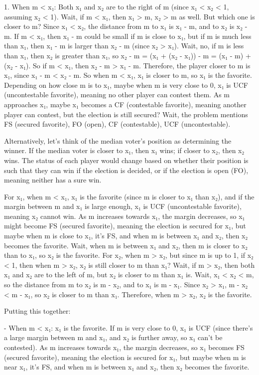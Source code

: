1. When m < x₁: Both x₁ and x₂ are to the right of m (since x₁ < x₂ < 1, assuming x₂ < 1). Wait, if m < x₁, then x₁ > m, x₂ > m as well. But which one is closer to m? Since x₁ < x₂, the distance from m to x₁ is x₁ - m, and to x₂ is x₂ - m. If m < x₁, then x₁ - m could be small if m is close to x₁, but if m is much less than x₁, then x₁ - m is larger than x₂ - m (since x₂ > x₁). Wait, no, if m is less than x₁, then x₂ is greater than x₁, so x₂ - m = (x₁ + (x₂ - x₁)) - m = (x₁ - m) + (x₂ - x₁). So if m < x₁, then x₂ - m > x₁ - m. Therefore, the player closer to m is x₁, since x₁ - m < x₂ - m. So when m < x₁, x₁ is closer to m, so x₁ is the favorite. Depending on how close m is to x₁, maybe when m is very close to 0, x₁ is UCF (uncontestable favorite), meaning no other player can contest them. As m approaches x₁, maybe x₁ becomes a CF (contestable favorite), meaning another player can contest, but the election is still secured? Wait, the problem mentions FS (secured favorite), FO (open), CF (contestable), UCF (uncontestable). 

Alternatively, let's think of the median voter's position as determining the winner. If the median voter is closer to x₁, then x₁ wins; if closer to x₂, then x₂ wins. The status of each player would change based on whether their position is such that they can win if the election is decided, or if the election is open (FO), meaning neither has a sure win. 

For x₁, when m < x₁, x₁ is the favorite (since m is closer to x₁ than x₂), and if the margin between m and x₁ is large enough, x₁ is UCF (uncontestable favorite), meaning x₂ cannot win. As m increases towards x₁, the margin decreases, so x₁ might become FS (secured favorite), meaning the election is secured for x₁, but maybe when m is close to x₁, it's FS, and when m is between x₁ and x₂, then x₂ becomes the favorite. Wait, when m is between x₁ and x₂, then m is closer to x₂ than to x₁, so x₂ is the favorite. For x₂, when m > x₂, but since m is up to 1, if x₂ < 1, then when m > x₂, x₂ is still closer to m than x₁? Wait, if m > x₂, then both x₁ and x₂ are to the left of m, but x₂ is closer to m than x₁ is. Wait, x₁ < x₂ < m, so the distance from m to x₂ is m - x₂, and to x₁ is m - x₁. Since x₂ > x₁, m - x₂ < m - x₁, so x₂ is closer to m than x₁. Therefore, when m > x₂, x₂ is the favorite. 

Putting this together:

- When m < x₁: x₁ is the favorite. If m is very close to 0, x₁ is UCF (since there's a large margin between m and x₁, and x₂ is further away, so x₁ can't be contested). As m increases towards x₁, the margin decreases, so x₁ becomes FS (secured favorite), meaning the election is secured for x₁, but maybe when m is near x₁, it's FS, and when m is between x₁ and x₂, then x₂ becomes the favorite. 

